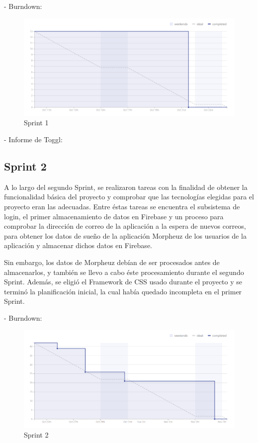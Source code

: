 \documentclass[11pt,openany]{book}
\begin{document}
- Burndown:

\begin{figure}[H]
\centering
\includegraphics[totalheight=7cm]{burndowns/Sprint1.png}
\caption{Sprint 1}
\end{figure}

- Informe de Toggl:



\subsection{Sprint 2}

A lo largo del segundo Sprint, se realizaron tareas con la finalidad de obtener la funcionalidad básica del proyecto y comprobar que las tecnologías elegidas para el proyecto eran las adecuadas. Entre éstas tareas se encuentra el subsistema de login, el primer almacenamiento de datos en Firebase y un proceso para comprobar la dirección de correo de la aplicación a la espera de nuevos correos, para obtener los datos de sueño de la aplicación Morpheuz de los usuarios de la aplicación y almacenar dichos datos en Firebase.

Sin embargo, los datos de Morpheuz debían de ser procesados antes de almacenarlos, y también se llevo a cabo éste procesamiento durante el segundo Sprint. Además, se eligió el Framework de CSS usado durante el proyecto y se terminó la planificación inicial, la cual había quedado incompleta en el primer Sprint.

- Burndown:

\begin{figure}[H]
\centering
\includegraphics[totalheight=7cm]{burndowns/Sprint2.png}
\caption{Sprint 2}
\end{figure}
\end{document}
